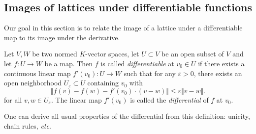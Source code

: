 \documentclass{lms}
\begin{document}
\subsection{Images of lattices under differentiable functions}

Our goal in this section is to relate the image of a lattice under a differentiable map
to its image under the derivative.

\begin{deftn} \label{deftn : diff}
Let $V, W$ be two normed $K$-vector spaces, let $U \subset V$ be an open 
subset of $V$ and let $f : U \rightarrow W$ be a map. Then $f$ is called 
\emph{differentiable} at $v_0 \in U$ if there exists a 
continuous linear map $f'(v_0) : U \rightarrow W$ such that for any 
$\varepsilon >0$, there exists an open neighborhood $U_\varepsilon 
\subset U$ containing $v_0$ with
\[ 
\Vert f(v)-f(w)-f'(v_0) \cdot \left( v-w \right) \Vert 
\leq \varepsilon \Vert v-w \Vert. 
\]
for all $v, w \in U_\varepsilon$.  The linear map $f'(v_0)$ is called the \emph{differential} of $f$ at $v_0$.
\end{deftn}

One can derive all usual properties of the differential from this 
definition: unicity, chain rules, \emph{etc}.
\end{document}
